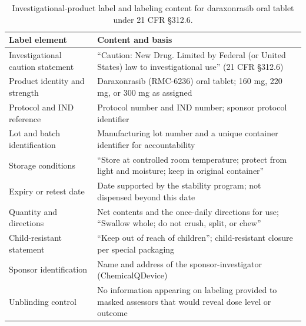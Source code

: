 \begin{table}[t]
\centering
\caption{Investigational-product label and labeling content for daraxonrasib
oral tablet under 21 CFR \S 312.6.}
\label{tab:cmc-labeling}
\begin{tabularx}{\textwidth}{L{4.6cm} Y}
\toprule
\textbf{Label element} & \textbf{Content and basis} \\
\midrule
Investigational caution statement & ``Caution: New Drug. Limited by Federal (or United States) law to investigational use'' (21 CFR \S 312.6) \\
Product identity and strength & Daraxonrasib (RMC-6236) oral tablet; 160 mg, 220 mg, or 300 mg as assigned \\
Protocol and IND reference & Protocol number and IND number; sponsor protocol identifier \\
Lot and batch identification & Manufacturing lot number and a unique container identifier for accountability \\
Storage conditions & ``Store at controlled room temperature; protect from light and moisture; keep in original container'' \\
Expiry or retest date & Date supported by the stability program; not dispensed beyond this date \\
Quantity and directions & Net contents and the once-daily directions for use; ``Swallow whole; do not crush, split, or chew'' \\
Child-resistant statement & ``Keep out of reach of children''; child-resistant closure per special packaging \\
Sponsor identification & Name and address of the sponsor-investigator (ChemicalQDevice) \\
Unblinding control & No information appearing on labeling provided to masked assessors that would reveal dose level or outcome \\
\bottomrule
\end{tabularx}
\vspace*{-0.2cm}
\end{table}

